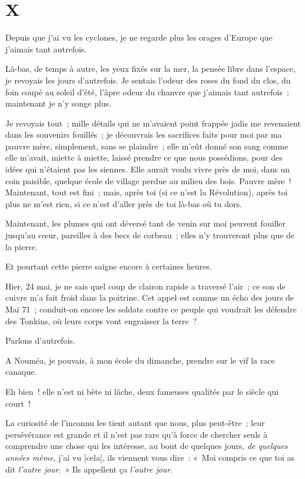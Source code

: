 \documentclass[french,twoside]{book} %
\newcommand\corr[1]{#1}
\newcommand\chapteropen{} %
\newcommand\chaptercont{} %
\begin{document}
\chapteropen
 \chapter[{X}]{X}
\label{p2.10}

\chaptercont
\noindent Depuis que j’ai vu les cyclones, je ne regarde plus les orages d’Europe que j’aimais tant autrefois.\par
Là-bas, de temps à autre, les yeux fixés sur la mer, la pensée libre dans l’espace, je revoyais les jours d’autrefois. Je sentais l’odeur des roses du fond du clos, du foin coupé au soleil d’été, l’âpre odeur du chanvre que j’aimais tant autrefois ; maintenant je n’y songe plus.\par
Je revoyais tout ; mille détails qui ne m’avaient point frappée jadis me revenaient dans les souvenirs fouillés ; je découvrais les sacrifices faits pour moi par ma pauvre mère, simplement, sans se plaindre ; elle m’eût donné son sang comme elle m’avait, miette à miette, laissé prendre ce que nous possédions, pour des idées qui n’étaient pas les siennes. Elle aurait voulu vivre près de moi, dans un coin paisible, quelque école de village perdue au milieu des bois.  Pauvre mère ! Maintenant, tout est fini ; mais, après toi (si ce n’est la Révolution), après toi plus ne m’est rien, si ce n’est d’aller près de toi là-bas où tu dors.\par
Maintenant, les plumes qui ont déversé tant de venin sur moi peuvent fouiller jusqu’au cœur, pareilles à des becs de corbeau ; elles n’y trouveront plus que de la pierre.\par
Et pourtant cette pierre saigne encore à certaines heures.\par
Hier, 24 mai, je ne sais quel coup de clairon rapide a traversé l’air ; ce son de cuivre m’a fait froid dans la poitrine. Cet appel est comme un écho des jours de Mai 71 ; conduit-on encore les soldats contre ce peuple qui voudrait les défendre des Tonkins, où leurs corps vont engraisser la terre ?\par
Parlons d’autrefois.\par
A Nouméa, je pouvais, à mon école du dimanche, prendre sur le vif la race canaque.\par
Eh bien ! elle n’est ni bête ni lâche, deux fameuses qualités par le siècle qui court !\par
La curiosité de l’inconnu les tient autant que nous, plus peut-être ; leur persévérance est grande et il n’est pas rare qu’à force de chercher seuls à comprendre une chose qui les intéresse, au bout de quelques jours, \emph{de quelques années  même}, j’ai vu [{\corr cela}], ils viennent vous dire : « Moi compris ce que toi as dit \emph{l’autre jour}. » Ils appellent ça \emph{l’autre jour}.\par
\end{document}
